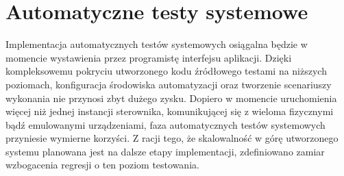 
\section{Automatyczne testy systemowe}
Implementacja automatycznych testów systemowych osiągalna będzie w momencie wystawienia przez programistę interfejsu aplikacji. Dzięki kompleksowemu pokryciu utworzonego
kodu źródłowego testami na niższych poziomach, konfiguracja środowiska automatyzacji oraz tworzenie scenariuszy wykonania nie przynosi zbyt dużego zysku. 
Dopiero w momencie uruchomienia więcej niż jednej instancji sterownika, komunikującej się z wieloma fizycznymi bądź emulowanymi urządzeniami, faza automatycznych testów
systemowych przyniesie wymierne korzyści. Z racji tego, że skalowalność w górę utworzonego systemu planowana jest na dalsze etapy implementacji, zdefiniowano zamiar
wzbogacenia regresji o ten poziom testowania.

